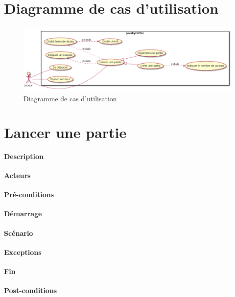 \section{Diagramme de cas d'utilisation}

\begin{figure}[h]%
	\includegraphics[width=\columnwidth]{images/UML_casUtilisation_Complet.png}%
	\caption{Diagramme de cas d'utilisation}%
	\label{fig:useCase}%
\end{figure}

\section{Lancer une partie}

\paragraph{Description}

\paragraph{Acteurs}

\paragraph{Pré-conditions}

\paragraph{Démarrage}

\paragraph{Scénario}

\paragraph{Exceptions}

\paragraph{Fin}

\paragraph{Post-conditions}



